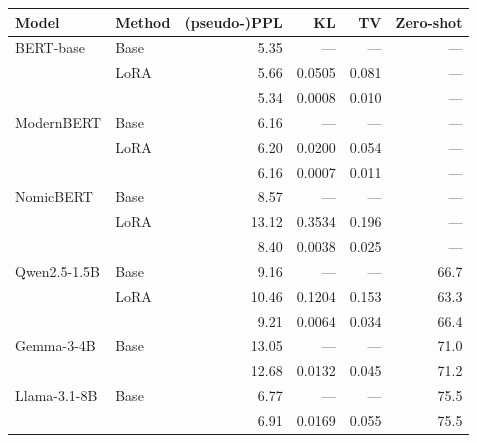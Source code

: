   \footnotesize\setlength{\tabcolsep}{4pt}
  \begin{tabular}{@{}llrrrr@{}}
    \toprule
    Model & Method & (pseudo-)PPL & KL & TV & Zero-shot \\
    \midrule
    BERT-base & Base & 5.35 & --- & --- & --- \\
     & LoRA & 5.66 & 0.0505 & 0.081 & --- \\
     & \PEAT{} & 5.34 & 0.0008 & 0.010 & --- \\
    \midrule
    ModernBERT & Base & 6.16 & --- & --- & --- \\
     & LoRA & 6.20 & 0.0200 & 0.054 & --- \\
     & \PEAT{} & 6.16 & 0.0007 & 0.011 & --- \\
    \midrule
    NomicBERT & Base & 8.57 & --- & --- & --- \\
     & LoRA & 13.12 & 0.3534 & 0.196 & --- \\
     & \PEAT{} & 8.40 & 0.0038 & 0.025 & --- \\
    \midrule
    Qwen2.5-1.5B & Base & 9.16 & --- & --- & 66.7 \\
     & LoRA & 10.46 & 0.1204 & 0.153 & 63.3 \\
     & \PEAT{} & 9.21 & 0.0064 & 0.034 & 66.4 \\
    \midrule
    Gemma-3-4B & Base & 13.05 & --- & --- & 71.0 \\
     & \PEAT{} & 12.68 & 0.0132 & 0.045 & 71.2 \\
    \midrule
    Llama-3.1-8B & Base & 6.77 & --- & --- & 75.5 \\
     & \PEAT{} & 6.91 & 0.0169 & 0.055 & 75.5 \\
    \bottomrule
  \end{tabular}
